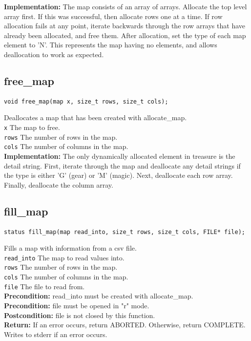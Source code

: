 \documentclass{article}
\begin{document}
 
 \textbf{Implementation:}
The map consists of an array of arrays. Allocate the top level array first.
If this was successful, then allocate rows one at a time.
If row allocation fails at any point, iterate backwards through the row arrays
     that have already been allocated, and free them.
After allocation, set the type of each map element to 'N'. This represents the
     map having no elements, and allows deallocation to work as expected.
 

\subsection{free\_map}
\begin{lstlisting}
void free_map(map x, size_t rows, size_t cols);
\end{lstlisting}


  Deallocates a map that has been created with  allocate\_map.\\ 
 \texttt{x} The map to free.\\ 
 \texttt{rows} The number of rows in the map.\\ 
 \texttt{cols} The number of columns in the map.\\ 
 
 
 \textbf{Implementation:}
The only dynamically allocated element in  treasure is
 the detail string.
First, iterate through the map and deallocate any detail strings
 if the type is either 'G' (gear) or 'M' (magic).
Next, deallocate each row array.
Finally, deallocate the column array.
 

\subsection{fill\_map}
\begin{lstlisting}
status fill_map(map read_into, size_t rows, size_t cols, FILE* file);
\end{lstlisting}


  Fills a map with information from a csv file.\\ 
 \texttt{read\_into} The map to read values into.\\ 
 \texttt{rows} The number of rows in the map.\\ 
 \texttt{cols} The number of columns in the map.\\ 
 \texttt{file} The file to read from.\\ 
 \textbf{Precondition:}  read\_into must be created with  allocate\_map.\\ 
 \textbf{Precondition:}  file must be opened in "r" mode.\\ 
 \textbf{Postcondition:}  file is not closed by this function.\\ 
 \textbf{Return:} If an error occurs, return ABORTED. Otherwise, return COMPLETE.
  Writes to stderr if an error occurs.\\ 
 
\end{document}
